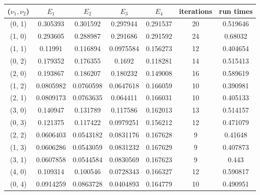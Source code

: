 \documentclass[12pt]{article}
\begin{document}
\begin{center}
\begin{tabular}{||c|cccc|c | c||}
\hline \hline
 ($\nu_1, \nu_2$)   & $E_1$ & $E_2$ &  $E_3$ & $E_4$ &   iterations & run times\\
\hline \hline
  \color{red}(0, 1)   &   \color{red}0.305393  &  \color{red}0.301592  &  \color{red}0.297944  &   \color{red}0.291537 &   \color{red}20 & \color{red}0.519646\\
 (1, 0)   &  0.293605  &      0.288987  &      0.291686  &       0.291592 &           24 & 0.68032 \\ \hline
  \color{red}(1, 1)   &   \color{red}0.11991   &  \color{red}0.116894  &  \color{red}0.0975584 &  \color{red}0.156273 &  \color{red}12 & \color{red}0.404654\\
 (0, 2)   &  0.179352  &      0.176355  &      0.1692    &       0.118281 &           14 & 0.515413 \\ 
 (2, 0)   &  0.193867  &      0.186207  &      0.180232  &       0.149008 &           16 & 0.589619 \\ \hline
  \color{red}(1, 2)   &   \color{red}0.0805982 &       \color{red}0.0760598 &      0.0647618 &       0.166059 &    \color{red}10 & \color{red}0.390981\\
  \color{red}(2, 1)   &  0.0809173 &      0.0763635 &       \color{red}0.064411  &        \color{red}0.166031 &   \color{red}10 & 0.405133 \\
 (3, 0)   &  0.140947  &      0.131789  &      0.117586  &       0.162013 &           13 & 0.514157 \\
 (0, 3)   &  0.121375  &      0.117422  &      0.0979251 &       0.156212 &           12 & 0.471079 \\ \hline
  \color{red}(2, 2)   &  0.0606403 &      0.0543182 &  0.0831176 &       0.167628 &  \color{red}9 & 0.41648  \\
  \color{red}(1, 3)   &  \color{red}0.0606286 &  \color{red}0.0543059 &      0.0831232 &       0.167629 &  \color{red}9  & \color{red}0.407873\\
  \color{red}(3, 1)   &  0.0607858 &      0.0544584 &   \color{red}0.0830569 &     \color{red}0.167623 &   \color{red}9  & 0.443\\
 (4, 0)   &  0.109314  &      0.100546  &      0.0728343 &       0.166327 &           12 &0.590817 \\
 (0, 4)   &  0.0914259 &      0.0863728 &      0.0404893 &       0.164779 &           10 & 0.490951\\
\hline \hline
\end{tabular}
\end{center}
 
\end{document}
